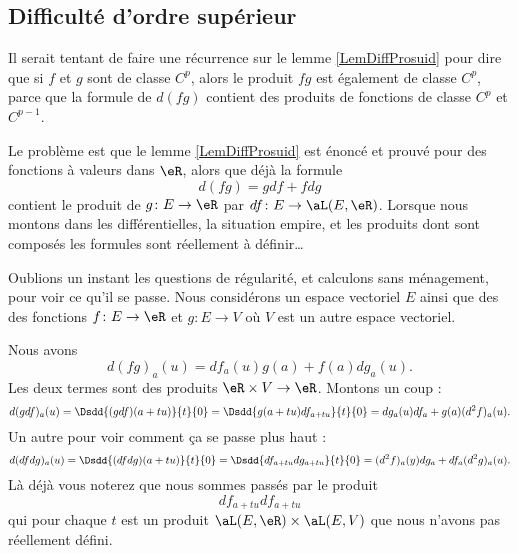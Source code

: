 \subsection{Difficulté d'ordre supérieur}

\begin{normaltext}
	Il serait tentant de faire une récurrence sur le lemme \ref{LemDiffProsuid} pour dire que si \( f\) et \( g\) sont de classe \( C^p\), alors le produit \( fg\) est également de classe \( C^p\), parce que la formule de \( d(fg)\) contient des produits de fonctions de classe \( C^p\) et \( C^{p-1}\).

	Le problème est que le lemme \ref{LemDiffProsuid} est énoncé et prouvé pour des fonctions à valeurs dans \( \eR\), alors que déjà la formule
	\begin{equation}
		d(fg)=gdf+fdg
	\end{equation}
	contient le produit de \( g\colon E\to \eR \) par \( df\colon E\to \aL(E,\eR)\). Lorsque nous montons dans les différentielles, la situation empire, et les produits dont sont composés les formules sont réellement à définir\ldots
\end{normaltext}

Oublions un instant les questions de régularité, et calculons sans ménagement, pour voir ce qu'il se passe. Nous considérons un espace vectoriel \( E\) ainsi que des des fonctions \( f\colon E\to \eR\) et \( g\colon E \to V\) où \( V\) est un autre espace vectoriel.

Nous avons
\begin{equation}
	d(fg)_a(u)=df_a(u)g(a)+f(a)dg_a(u).
\end{equation}
Les deux termes sont des produits \( \eR\times V\to \eR\). Montons un coup :
\begin{equation}
	d(gdf)_a(u)=\Dsdd{ (gdf)(a+tu) }{t}{0}=\Dsdd{ g(a+tu)df_{a+tu} }{t}{0}=dg_a(u)df_a+g(a)(d^2f)_a(u).
\end{equation}
Un autre pour voir comment ça se passe plus haut :
\begin{equation}
	d(dfdg)_a(u)=\Dsdd{ (dfdg)(a+tu) }{t}{0}=\Dsdd{ df_{a+tu}dg_{a+tu} }{t}{0}=(d^2f)_a(y)dg_a+df_a(d^2g)_a(u).
\end{equation}
Là déjà vous noterez que nous sommes passés par le produit
\begin{equation}
	df_{a+tu}df_{a+tu}
\end{equation}
qui pour chaque \( t\) est un produit \( \aL(E,\eR)\times \aL(E,V)\) que nous n'avons pas réellement défini.

